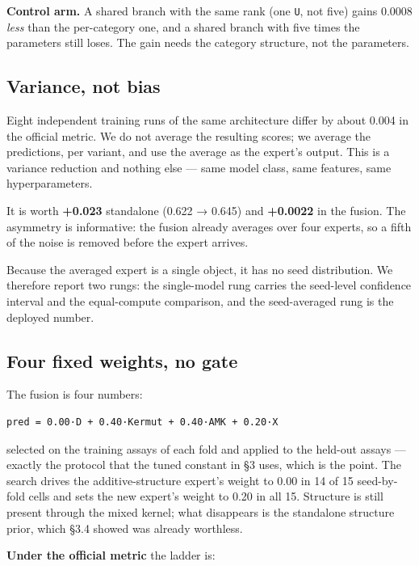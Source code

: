 \documentclass{article}
\begin{document}
\textbf{Control arm.} A shared branch with the same rank (one \texttt{U}, not five) gains 0.0008 \emph{less} than the
per-category one, and a shared branch with five times the parameters still loses. The gain needs the
category structure, not the parameters.

\subsection{Variance, not bias}\label{variance-not-bias}

Eight independent training runs of the same architecture differ by about 0.004 in the official metric.
We do not average the resulting scores; we average the predictions, per variant, and use the average as
the expert's output. This is a variance reduction and nothing else --- same model class, same features,
same hyperparameters.

It is worth \textbf{+0.023} standalone (0.622 → 0.645) and \textbf{+0.0022} in the fusion. The asymmetry is
informative: the fusion already averages over four experts, so a fifth of the noise is removed before
the expert arrives.

Because the averaged expert is a single object, it has no seed distribution. We therefore report two
rungs: the single-model rung carries the seed-level confidence interval and the equal-compute
comparison, and the seed-averaged rung is the deployed number.

\subsection{Four fixed weights, no gate}\label{four-fixed-weights-no-gate}

The fusion is four numbers:

\begin{verbatim}
pred = 0.00·D + 0.40·Kermut + 0.40·AMK + 0.20·X
\end{verbatim}

selected on the training assays of each fold and applied to the held-out assays --- exactly the protocol
that the tuned constant in §3 uses, which is the point. The search drives the additive-structure
expert's weight to 0.00 in 14 of 15 seed-by-fold cells and sets the new expert's weight to 0.20 in all
15. Structure is still present through the mixed kernel; what disappears is the standalone structure
prior, which §3.4 showed was already worthless.

\textbf{Under the official metric} the ladder is:
\end{document}
